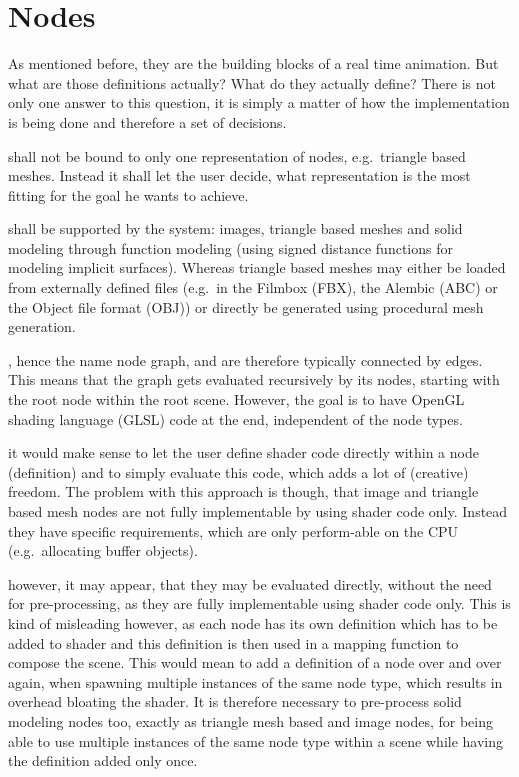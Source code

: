 \documentclass[%
    a4paper,    %
    justified,  %
    nobib,      %
    openany     %
]{tufte-book}
\makeatletter
\renewcommand{\label}[1]{\@tufte@label{##1}}%
\makeatother
\begin{document}
\section{Nodes}
\label{appendix:sec:node-grahp:nodes}

 As mentioned before, they are
the building blocks of a real time animation. But what are those definitions
actually? What do they actually define? There is not only one answer to this
question, it is simply a matter of how the implementation is being done and
therefore a set of decisions.

 shall not be bound to only one
representation of nodes, e.g.\ triangle based meshes. Instead it shall let the
user decide, what representation is the most fitting for the goal he wants to
achieve.

 shall be supported by the
system: images, triangle based meshes and solid modeling through function
modeling (using signed distance functions for modeling implicit surfaces).
Whereas triangle based meshes may either be loaded from externally defined files
(e.g.\ in the Filmbox (FBX), the Alembic (ABC) or the Object file format (OBJ))
or directly be generated using procedural mesh generation.

, hence the name node graph, and
are therefore typically connected by edges. This means that the graph gets
evaluated recursively by its nodes, starting with the root node within the root
scene. However, the goal is to have OpenGL shading language (GLSL) code at the
end, independent of the node types.

 it would make sense to let the user define
shader code directly within a node (definition) and to simply evaluate this
code, which adds a lot of (creative) freedom. The problem with this approach is
though, that image and triangle based mesh nodes are not fully implementable by
using shader code only. Instead they have specific requirements, which are only
perform-able on the CPU (e.g.\ allocating buffer objects).

 however, it may
appear, that they may be evaluated directly, without the need for
pre-processing, as they are fully implementable using shader code only. This is
kind of misleading however, as each node has its own definition which has to be
added to shader and this definition is then used in a mapping function to
compose the scene. This would mean to add a definition of a node over and over
again, when spawning multiple instances of the same node type, which results in
overhead bloating the shader. It is therefore necessary to pre-process solid
modeling nodes too, exactly as triangle mesh based and image nodes, for being
able to use multiple instances of the same node type within a scene while having
the definition added only once.
\end{document}
